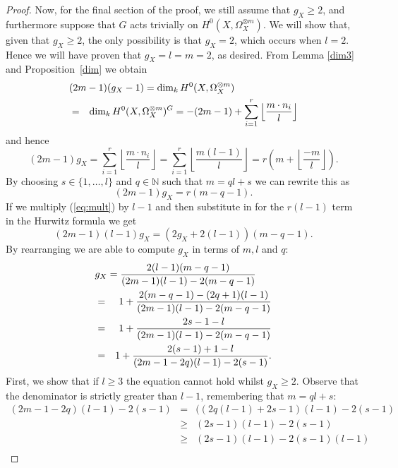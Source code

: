 \documentclass[11pt]{article} %
\theoremstyle{remark}\newtheorem*{rem}{Remark}
\begin{document}
\begin{proof}
    Now, for the final section of the proof, we still assume that $g_X\geq 2$, and furthermore suppose that $G$ acts trivially on $H^0(X,\Omega_X^{\otimes m})$. 
    We will show that, given that $g_X\geq 2$, the only possibility is that $g_X=2$, which occurs when $l=2$.
    Hence we will have proven that $g_X=l=m=2$, as desired.
    From Lemma \ref{dim3} and Proposition~\ref{dim} we obtain
      \begin{eqnarray*}
	\lefteqn{(2m-1)(g_X-1)=\dim_kH^0(X,\Omega_X^{\otimes m})} \\
	& = & \dim_kH^0(X,\Omega_X^{\otimes m})^G=-(2m-1)+\sum_{i=1}^r \left\lfloor \frac{m\cdot n_i}{l} \right\rfloor
      \end{eqnarray*}
    and hence
      \begin{equation*}
	(2m-1)g_X = \sum_{i=1}^r \left\lfloor \frac{m\cdot n_i}{l} \right\rfloor
	= \sum_{i=1}^r \left\lfloor \frac{m(l-1)}{l} \right\rfloor
	= r\left( m+\left\lfloor \frac{-m}{l} \right\rfloor \right).
      \end{equation*}
    By choosing $s\in \{1,\ldots ,l\}$ and $q\in \mathbb{N}$ such that $m=ql+s$ we can rewrite this as
      \begin{equation}\label{eq:mult}
	(2m-1)g_X=r(m-q-1).
      \end{equation}
    If we multiply (\ref{eq:mult}) by $l-1$ and then substitute in for the $r(l-1)$ term in the Hurwitz formula we get
      \begin{equation*}
	(2m-1)(l-1)g_X=(2g_X+2(l-1))(m-q-1).
      \end{equation*}
    By rearranging we are able to compute $g_X$ in terms of $m,l$ and $q$:
      \begin{eqnarray*}
	\lefteqn{g_X = \frac{2(l-1)(m-q-1)}{(2m-1)(l-1)-2(m-q-1)}} \\
	& = & 1 + \frac{2(m-q-1)-(2q+1)(l-1)}{(2m-1)(l-1)-2(m-q-1)} \\
	& = & 1 + \frac{2s-1-l}{(2m-1)(l-1)-2(m-q-1)}  \\
	& = & 1 + \frac{2(s-1)+1-l}{(2m-1-2q)(l-1)-2(s-1)}. 
      \end{eqnarray*}
    First, we show that if $l\geq 3$ the equation cannot hold whilst $g_X\geq 2$.
    Observe that the denominator is strictly greater than $l-1$, remembering that $m=ql+s$:
      \begin{eqnarray*}
	(2m-1-2q)(l-1)-2(s-1) & = & ((2q(l-1)+2s-1)(l-1)-2(s-1) \\
	& \geq & (2s-1)(l-1)-2(s-1) \\
	& \geq & (2s-1)(l-1)-2(s-1)(l-1) \\

\end{eqnarray*}
\end{proof}
\end{document}
